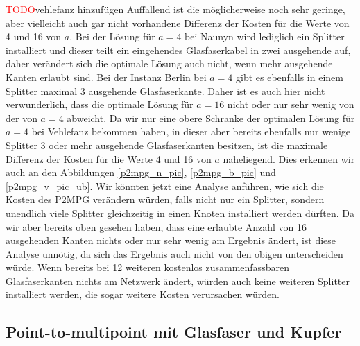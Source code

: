 \documentclass[11pt,a4paper]{article}
\newcommand{\TODO}{\textcolor{red}{TODO}}
\theoremstyle{my_th_style1}
\begin{document}
\TODO vehlefanz hinzufügen Auffallend ist die m\"oglicherweise noch sehr geringe, aber vielleicht auch gar nicht vorhandene Differenz der Kosten f\"ur die Werte von 4 und 16 von \(a\).
Bei der L\"osung f\"ur \(a=4\) bei Naunyn wird lediglich ein Splitter installiert und dieser teilt ein eingehendes Glasfaserkabel in zwei ausgehende auf, daher ver\"andert sich die optimale L\"osung auch nicht, wenn mehr ausgehende Kanten erlaubt sind.
Bei der Instanz Berlin bei \(a=4\) gibt es ebenfalls in einem Splitter maximal 3 ausgehende Glasfaserkante.
Daher ist es auch hier nicht verwunderlich, dass die optimale L\"osung f\"ur \(a=16\) nicht oder nur sehr wenig von der von \(a=4\) abweicht.
Da wir nur eine obere Schranke der optimalen L\"osung f\"ur \(a=4\) bei Vehlefanz bekommen haben, in dieser aber bereits ebenfalls nur wenige Splitter 3 oder mehr ausgehende Glasfaserkanten besitzen, ist die maximale Differenz der Kosten f\"ur die Werte 4 und 16 von \(a\) naheliegend.
Dies erkennen wir auch an den Abbildungen \eqref{p2mpg_n_pic}, \eqref{p2mpg_b_pic} und \eqref{p2mpg_v_pic_ub}.
Wir k\"onnten jetzt eine Analyse anf\"uhren, wie sich die Kosten des P2MPG ver\"andern w\"urden, falls nicht nur ein Splitter, sondern unendlich viele Splitter gleichzeitig in einen Knoten installiert werden d\"urften.
Da wir aber bereits oben gesehen haben, dass eine erlaubte Anzahl von 16 ausgehenden Kanten nichts oder nur sehr wenig am Ergebnis \"andert, ist diese Analyse unn\"otig, da sich das Ergebnis auch nicht von den obigen unterscheiden w\"urde.
Wenn bereits bei 12 weiteren kostenlos zusammenfassbaren Glasfaserkanten nichts am Netzwerk \"andert, w\"urden auch keine weiteren Splitter installiert werden, die sogar weitere Kosten verursachen w\"urden.
 
\subsection{Point-to-multipoint mit Glasfaser und Kupfer}
\end{document}
